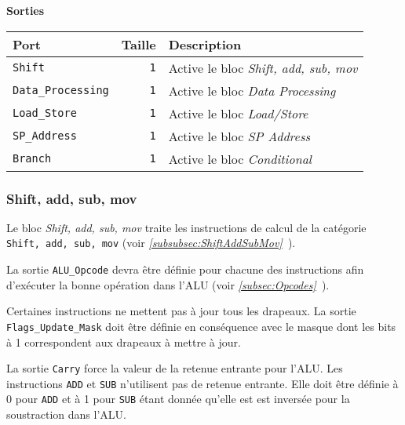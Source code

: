 \documentclass{article}
\begin{document}
    \vspace{1em}
    \textbf{Sorties}\\

    \begin{tabular}{|l|r|l|}
        \hline
        \textbf{Port}              & \textbf{Taille} & \textbf{Description}                         \\
        \hline

        \texttt{Shift}          & \texttt{1}      & Active le bloc \textit{Shift, add, sub, mov} \\
        \hline
        \texttt{Data\_Processing} & \texttt{1}      & Active le bloc \textit{Data Processing}      \\
        \hline
        \texttt{Load\_Store}     & \texttt{1}      & Active le bloc \textit{Load/Store}           \\
        \hline
        \texttt{SP\_Address}     & \texttt{1}      & Active le bloc \textit{SP Address}           \\
        \hline
        \texttt{Branch}         & \texttt{1}      & Active le bloc \textit{Conditional}          \\

        \hline
    \end{tabular}

    \subsubsection{Shift, add, sub, mov}
    \label{sec:SASM}

    Le bloc \textit{Shift, add, sub, mov} traite les instructions de calcul de la catégorie \texttt{Shift, add, sub, mov} (voir \textit{\ref{subsubsec:ShiftAddSubMov}~}).

    La sortie \texttt{ALU\_Opcode} devra être définie pour chacune des instructions afin d'exécuter la bonne opération dans l'ALU (voir \textit{\ref{subsec:Opcodes}~}).

    Certaines instructions ne mettent pas à jour tous les drapeaux.
    La sortie \texttt{Flags\_Update\_Mask} doit être définie en conséquence avec le masque dont les bits à 1 correspondent aux drapeaux à mettre à jour.

    La sortie \texttt{Carry} force la valeur de la retenue entrante pour l'ALU. Les instructions \texttt{ADD} et \texttt{SUB} n'utilisent pas de retenue entrante.
    Elle doit être définie à 0 pour \texttt{ADD} et à 1 pour \texttt{SUB} étant donnée qu'elle est est inversée pour la soustraction dans l'ALU.
\end{document}
